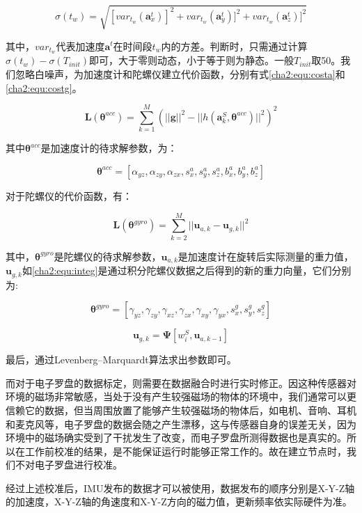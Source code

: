 \begin{equation}
\label{cha2:equ:static}
  \sigma(t_{w}) = \sqrt{[var_{t_{w}}(\mathbf{a}^{t}_{x})]^{2}+var_{t_{w}}(\mathbf{a}^{t}_{y})]^{2}+var_{t_{w}}(\mathbf{a}^{t}_{z})]^{2}}
\end{equation}

其中，$var_{t_{w}}$代表加速度$\mathbf{a}^{t}$在时间段$t_w$内的方差。判断时，只需通过计算$\sigma(t_{w}) - \sigma(T_{init})$即可，大于零则动态，小于等于则为静态。一般$T_{init}$取50。我们忽略白噪声，为加速度计和陀螺仪建立代价函数，分别有式\ref{cha2:equ:costa}和\ref{cha2:equ:costg}。

\begin{equation}
\label{cha2:equ:costa}
\mathbf{L}(\mathbf{\theta} ^{acc}) = \sum^{M}_{k=1}(||\mathbf{g}||^{2}-||h(\mathbf{a}^{S}_{k},\mathbf{\theta}^{acc})||^{2})^{2}
\end{equation}

其中$\mathbf{\theta} ^{acc}$是加速度计的待求解参数，为：

\begin{equation}
  \mathbf{\theta}^{acc}=[\alpha_{yz},\alpha_{zy},\alpha_{zx},s^{a}_{x},s^{a}_{y},s^{a}_{z},b^{a}_{x},b^{a}_{y},b^{a}_{z}]
\end{equation}

对于陀螺仪的代价函数，有：

\begin{equation}
\label{cha2:equ:costg}
\mathbf{L}(\mathbf{\theta} ^{gyro})=\sum^{M}_{k=2}||\mathbf{u}_{a,k}-\mathbf{u}_{g,k}||^{2}
\end{equation}

其中，$\mathbf{\theta} ^{gyro}$是陀螺仪的待求解参数，$\mathbf{u}_{a,k}$是加速度计在旋转后实际测量的重力值，$\mathbf{u}_{g,k}$如\ref{cha2:equ:integ}是通过积分陀螺仪数据之后得到的新的重力向量，它们分别为:

\begin{equation}
  \mathbf{\theta} ^{gyro}=[\gamma_{yz},\gamma_{zy},\gamma_{xz},\gamma_{zx},\gamma_{xy},\gamma_{yx},s^{g}_{x},s^{g}_{y},s^{g}_{z}]
\end{equation}

\begin{equation}
\label{cha2:equ:integ}
\mathbf{u}_{g,k}=\mathbf{\Psi}[w^{S}_{i},\mathbf{u}_{a,k-1}]
\end{equation}

最后，通过Levenberg–Marquardt算法求出参数即可。

而对于电子罗盘的数据标定，则需要在数据融合时进行实时修正。因这种传感器对环境的磁场非常敏感，当处于没有产生较强磁场的物体的环境中，我们通常可以更信赖它的数据，但当周围放置了能够产生较强磁场的物体后，如电机、音响、耳机和麦克风等，电子罗盘的数据会随之产生漂移，这与传感器自身的误差无关，因为环境中的磁场确实受到了干扰发生了改变，而电子罗盘所测得数据也是真实的。所以在工作前校准的结果，是不能保证运行时能够正常工作的。故在建立节点时，我们不对电子罗盘进行校准。

经过上述校准后，IMU发布的数据才可以被使用，数据发布的顺序分别是X-Y-Z轴的加速度，X-Y-Z轴的角速度和X-Y-Z方向的磁力值，更新频率依实际硬件为准。